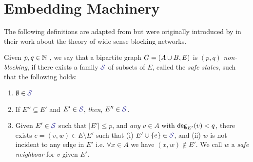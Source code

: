 \documentclass[11pt]{article}
\begin{document}
\section{Embedding Machinery}

The following definitions are adapted from \citep{nenadov2023routing} but were originally introduced by \citet{feldman1988wide} in their work about the theory of wide sense blocking networks.

\begin{definition}
Given $p,q \in \mathbb{N}$ , we say that a bipartite graph $G = (A \cup B, E)$ is $(p, q)$ \emph{non-blocking}, if there exists a family $\Family{S}$ of subsets of $E$, called the \emph{safe states}, such that the following holds:

\begin{enumerate}
	\item $\emptyset \in \Family{S}$
	\item If $E'' \subseteq E'$ and $E' \in \Family{S}$, \emph{then}, $E'' \in \Family{S}$.
	\item Given $E' \in \Family{S}$ such that $|E'| \leq p$, and \emph{any} $v \in A$ with $\mathsf{deg}_{E'}(v) < q$, there exists $e = (v, w) \in E \setminus E'$  such that (i) $E' \cup \Set{e} \in \SafeStates $, and (ii) $w$ is not incident to any edge in $E'$ i.e. $\forall x \in A$ we have $(x,w) \notin E'$. 
 We call $w$ a \emph{safe neighbour} for $v$ given $E'$.
\end{enumerate}

\end{definition}
\end{document}
